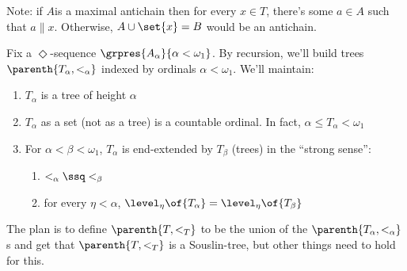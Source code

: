 Note: if $A $is a maximal antichain then for every $x \in T$, there's some $a \in A$ such that $a \parallel x$. Otherwise, $A \cup \set{x} = B$ would be an antichain.

\begin{boxconstruction}
    Fix a $\Diamond$-sequence $\grpres{A_{\alpha}}{\alpha < \omega_1}$. By recursion, we'll build trees $\parenth{T_{\alpha}, <_{\alpha}}$ indexed by ordinals $\alpha < \omega_1$. We'll maintain:
    \begin{enumerate}
        \item $T_{\alpha}$ is a tree of height $\alpha$
        \item $T_{\alpha}$ as a set (not as a tree) is a countable ordinal. In fact, $\alpha \leq T_{\alpha} < \omega_1$
        \item For $\alpha < \beta < \omega_1$, $T_{\alpha}$ is end-extended by $T_{\beta}$ (trees) in the ``strong sense'':
        \begin{enumerate}
            \item $<_{\alpha} \ssq <_{\beta}$
            \item for every $\eta < \alpha$, $\level_{\eta}\of{T_{\alpha}} = \level_{\eta}\of{T_{\beta}}$
        \end{enumerate}
    \end{enumerate}
    The plan is to define $\parenth{T, <_T}$ to be the union of the $\parenth{T_{\alpha}, <_{\alpha}}$s and get that $\parenth{T, <_T}$ is a Souslin-tree, but other things need to hold for this. \\


\end{boxconstruction}
